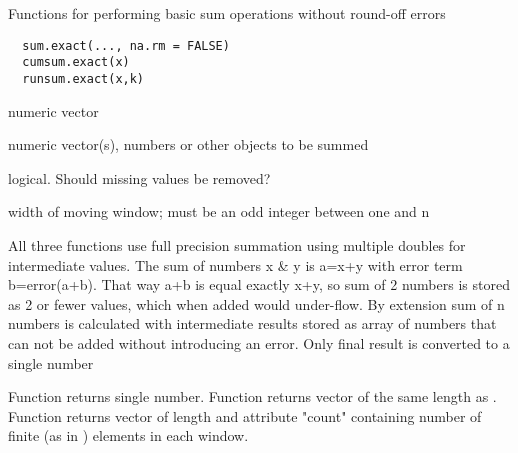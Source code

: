 \begin{Description}\relax
Functions for performing basic sum operations without round-off errors
\end{Description}
\begin{Usage}
\begin{verbatim}
  sum.exact(..., na.rm = FALSE)
  cumsum.exact(x)
  runsum.exact(x,k)
\end{verbatim}
\end{Usage}
\begin{Arguments}
\begin{ldescription}
\item[\code{x}] numeric vector
\item[\code{...}] numeric vector(s), numbers or other objects to be summed
\item[\code{na.rm}] logical. Should missing values be removed?
\item[\code{k}] width of moving window; must be an odd integer between one and n 
\end{ldescription}
\end{Arguments}
\begin{Details}\relax
All three functions use full precision summation using multiple doubles for 
intermediate values. The sum of numbers x \& y is a=x+y with error term 
b=error(a+b). That way a+b is equal exactly x+y, so sum of 2 numbers is stored
as 2 or fewer values, which when added would under-flow. By extension sum of n 
numbers is calculated with intermediate results stored as array of numbers 
that can not be added without introducing an error. Only final result is 
converted to a single number
\end{Details}
\begin{Value}
Function  returns single number. Function  
returns vector of the same length as . Function  
returns vector of length  and attribute "count" containing
number of finite (as in ) elements in each window.
\end{Value}

